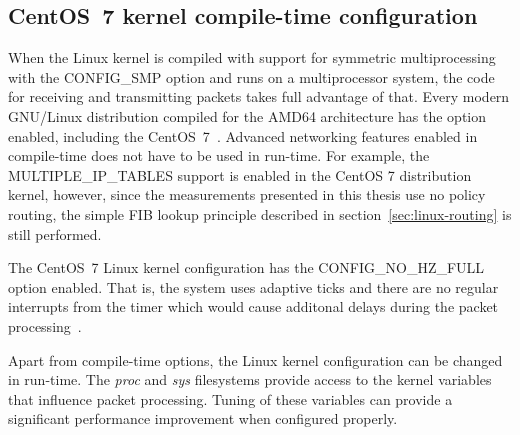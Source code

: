 
\subsection{CentOS~7 kernel compile-time configuration}
When the Linux kernel is compiled with support for symmetric multiprocessing
with the CONFIG\_SMP option and runs on a multiprocessor system, the code for receiving and
transmitting packets takes full advantage of that.
Every modern GNU/Linux distribution compiled for the AMD64 architecture has the option enabled,
including the CentOS~7~\cite{understanding-internals}.
Advanced networking features enabled in compile-time
does not have to be used in run-time.
For example, the MULTIPLE\_IP\_TABLES support is enabled in the CentOS 7 distribution kernel, however,
since the measurements presented in this thesis use no policy routing,
the simple FIB lookup principle described in section~\ref{sec:linux-routing} is still performed.

The CentOS~7 Linux kernel configuration has the CONFIG\_NO\_HZ\_FULL option enabled.
That is, the system uses adaptive ticks
and there are no regular interrupts from the timer
which would cause additonal delays during the packet processing~\cite{kernel-doc-nohz}.

Apart from compile-time options, the Linux kernel configuration can be changed in run-time.
The {\it{proc}} and {\it{sys}} filesystems provide access to the kernel variables that influence packet processing.
Tuning of these variables can provide a significant performance improvement when configured properly.

